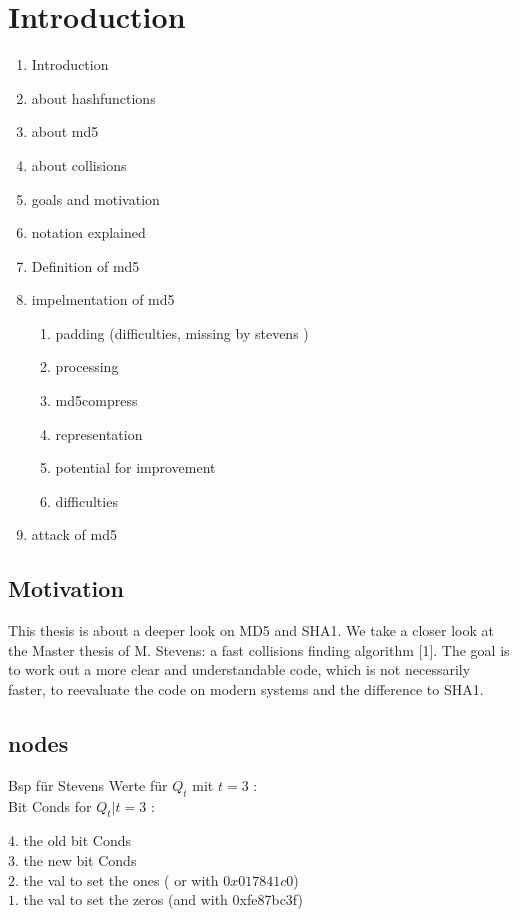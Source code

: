 \chapter{Introduction}
\begin{enumerate}

 
    \item Introduction
    \item about hashfunctions
    \item about md5
    \item about collisions
    \item goals and motivation
    \item notation explained
    \item Definition of md5
    \item impelmentation of md5
        \begin{enumerate}
            \item padding (difficulties, missing by stevens )
            \item processing
            \item md5compress
            \item representation
            \item potential for improvement 
            \item difficulties
        \end{enumerate}
    \item attack of md5
\end{enumerate}
\section*{Motivation}
This thesis is about a deeper look on MD5 and SHA1.
We take a closer look at the Master thesis of M. Stevens: a fast collisions finding algorithm [1].
The goal is to work out a more clear and understandable code, which is not necessarily faster, to reevaluate the code on modern systems and the difference to SHA1. 


\section*{nodes}
 
Bsp für Stevens Werte für $Q_t$ mit $t = 3$ :\\

Bit Conds for $Q_t | t =3$ :

$4.$ the old bit Conds\\
$3.$ the new bit Conds\\
$2.$ the val to set the ones ( or with $0x017841c0$)\\
$1.$ the val to set the zeros (and with 0xfe87bc3f)\\

